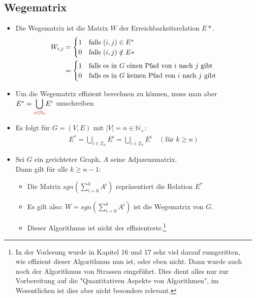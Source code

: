 \documentclass{article}
\newcommand{\N}{\mathbb{N_+}} %
\newcommand{\Nz}{{\mathbb{N}_0}} %
\newcommand{\Z}{\mathbb{Z}} %
\newcommand{\important}[1]{\textcolor{importantColor}{#1}}
\begin{document}
\subsection{Wegematrix}
\begin{itemize}
    \item Die Wegematrix ist die Matrix $W$ der Erreichbarkeitsrelation $E*$.
    \begin{align*}
        W_{i,j}&=
    \begin{cases}
        1 &$falls $(i,j)\in E^*\\
        0 &$falls $(i,j)\notin E*
    \end{cases}\\
    &=
    \begin{cases}
        1 &$falls es in $G$ einen Pfad von $i$ nach $j$ gibt$\\
        0 &$falls es in $G$ keinen Pfad von $i$ nach $j$ gibt$\\
    \end{cases}
    \end{align*}
    \item Um die Wegematrix effizient berechnen zu können, muss man aber $E^*=\displaystyle{\bigcup_{\important{i\in\Nz}}}E^i$ umschreiben
    \item Es folgt für $G=(V,E)$ mit $|V|=n \in\N$:
    \begin{align*}
        E^*=\bigcup_{i\in\Z_n}E^i = \bigcup_{i\in\Z_k}E^i \quad(\text{für }k\geq n)
    \end{align*}
    \item Sei $G$ ein gerichteter Graph, $A$ seine Adjazenzmatrix.\\
    Dann gilt für alle $k\geq n-1$:
    \begin{itemize}
        \item Die Matrix $sgn\left(\displaystyle{\sum^k_{i=0}A^i}\right)$ repräsentiert die Relation $E^*$
        \item Es gilt also: $W=sgn\left(\displaystyle{\sum^k_{i=0}A^i}\right)$ ist die Wegematrix von $G$.
        \item Dieser Algorithmus ist nicht der effizienteste.\footnote{In der Vorlesung wurde in Kapitel 16 und 17 sehr viel darauf rumgeritten, wie effizient dieser Algorithmus nun ist, oder eben nicht. Dann wurde auch noch der Algorithmus von Strassen eingeführt. Dies dient alles nur zur Vorbereitung auf die "Quantitativen Aspekte von Algorithmen", im Wesentlichen ist dies aber nicht besonders relevant.}
    \end{itemize}
\end{itemize}
\end{document}
